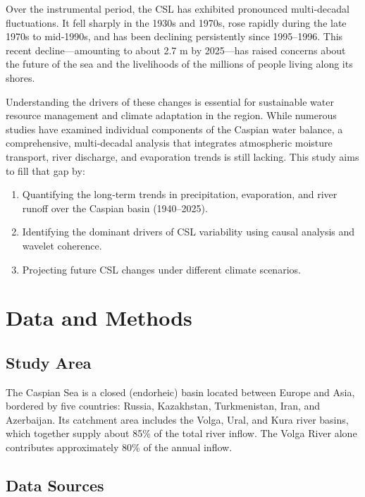 \documentclass[12pt,a4paper]{article}
\begin{document}
Over the instrumental period, the CSL has exhibited pronounced multi‑decadal fluctuations. It fell sharply in the 1930s and 1970s, rose rapidly during the late 1970s to mid‑1990s, and has been declining persistently since 1995–1996. This recent decline—amounting to about 2.7 m by 2025—has raised concerns about the future of the sea and the livelihoods of the millions of people living along its shores.

Understanding the drivers of these changes is essential for sustainable water resource management and climate adaptation in the region. While numerous studies have examined individual components of the Caspian water balance, a comprehensive, multi‑decadal analysis that integrates atmospheric moisture transport, river discharge, and evaporation trends is still lacking. This study aims to fill that gap by:

\begin{enumerate}
    \item Quantifying the long‑term trends in precipitation, evaporation, and river runoff over the Caspian basin (1940–2025).
    \item Identifying the dominant drivers of CSL variability using causal analysis and wavelet coherence.
    \item Projecting future CSL changes under different climate scenarios.
\end{enumerate}

\section{Data and Methods}

\subsection{Study Area}

The Caspian Sea is a closed (endorheic) basin located between Europe and Asia, bordered by five countries: Russia, Kazakhstan, Turkmenistan, Iran, and Azerbaijan. Its catchment area includes the Volga, Ural, and Kura river basins, which together supply about 85\% of the total river inflow. The Volga River alone contributes approximately 80\% of the annual inflow.

\subsection{Data Sources}
\end{document}
